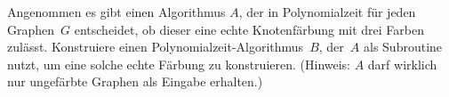 \documentclass{uebung_cs}
\begin{document}

\begin{exercise}
	Angenommen es gibt einen Algorithmus $A$, der in Polynomialzeit für jeden Graphen~$G$ entscheidet, ob dieser eine echte Knotenfärbung mit drei Farben zulässt.
	Konstruiere einen Polynomialzeit-Algorithmus~$B$, der~$A$ als Subroutine nutzt, um eine solche echte Färbung zu konstruieren.
	(Hinweis: $A$ darf wirklich nur ungefärbte Graphen als Eingabe erhalten.)
\end{exercise}

		


\end{document}
